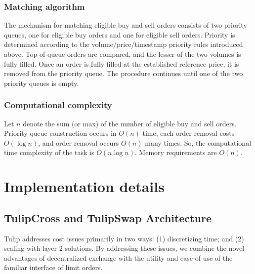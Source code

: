 \documentclass[11pt, reqno]{amsart}
\theoremstyle{definition}
\theoremstyle{remark}
\begin{document}
\subsubsection{Matching algorithm}
The mechanism for matching eligible buy and sell orders consists of two
priority queues, one for eligible buy orders and one for eligible sell orders.
Priority is determined according to the volume/price/timestamp priority rules
introduced above. Top-of-queue orders are compared, and the lesser of the two
volumes is fully filled. Once an order is fully filled at the established
reference price, it is removed from the priority queue. The procedure continues
until one of the two priority queues is empty.

\subsubsection{Computational complexity}
Let $n$ denote the sum (or max) of the number of eligible buy and sell orders.
Priority queue construction occurs in $O(n)$ time, each order removal costs
$O(\log n)$, and order removal occurs $O(n)$ many times. So, the computational
time complexity of the task is $O(n \log n)$. Memory requirements are $O(n)$.



\section{Implementation details}

\subsection{TulipCross and TulipSwap Architecture}
Tulip addresses cost issues primarily in two ways: (1) discretizing time; and
(2) scaling with layer 2 solutions. By addressing these issues, we combine the
novel advantages of decentralized exchange with the utility and ease-of-use of
the familiar interface of limit orders.
\end{document}
